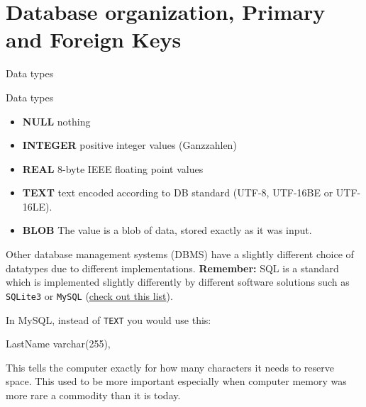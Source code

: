 \section{Database organization, Primary and Foreign Keys}
\begin{frame}[fragile]{Data types}
  \footnotesize
      \begin{alertblock}{Data types}
        \begin{itemize}
            \item \textbf{NULL} nothing
            \item \textbf{INTEGER} positive integer values (Ganzzahlen)
            \item \textbf{REAL} 8-byte IEEE floating point values
            \item \textbf{TEXT} text encoded according to DB standard (UTF-8, UTF-16BE or UTF-16LE).
            \item \textbf{BLOB} The value is a blob of data, stored exactly as it was input.
        \end{itemize}
      \end{alertblock}
      
      Other database management systems (DBMS) have a slightly different choice of datatypes due to different implementations. \textbf{Remember: }SQL is a standard which is implemented slightly differently by different software solutions such as \texttt{SQLite3} or \texttt{MySQL} (\alert{\href{https://www.w3schools.com/sql/sql_datatypes.asp}{check out this list}}).
      
      In MySQL, instead of \texttt{TEXT} you would use this:
      \begin{sqlcode}
          LastName varchar(255),
      \end{sqlcode}
      This tells the computer exactly for how many characters it needs to reserve space. This used to be more important especially when computer memory was more rare a commodity than it is today.  
      
\end{frame}





